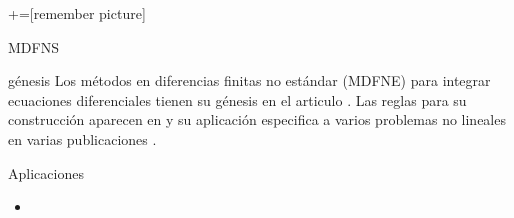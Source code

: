 +=[remember picture]

\begin{bibunit}[aalpha]
\begin{frame}{MDFNS}
  \begin{block}{génesis}
    Los métodos en diferencias finitas no estándar (MDFNE) para integrar ecuaciones diferenciales tienen su
génesis
    en el articulo \cite{Mickens1989}. Las reglas para su construcción  aparecen en \cite{mickens1994nonstandard}
y su aplicación
    especifica a varios problemas no lineales en varias publicaciones \cite{Mickens}.

  \end{block}
\end{frame}
\end{bibunit}
\begin{bibunit}[aalpha]
\begin{frame}
  \begin{exampleblock}{Aplicaciones}
  \begin{overlayarea}{\textwidth}{.2\textheight}
  \begin{itemize}
     \item
  \end{itemize}
  \end{overlayarea}
  \end{exampleblock}
\end{frame}
\end{bibunit}

